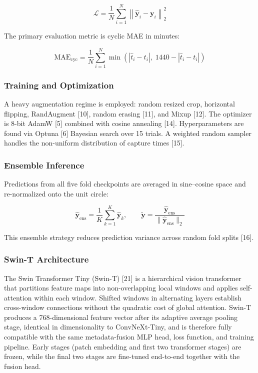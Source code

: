 \documentclass[9pt, a4paper, twocolumn]{article}
\begin{document}
\begin{equation}
\mathcal{L} = \frac{1}{N} \sum_{i=1}^{N}
    \left\| \hat{\mathbf{y}}_i - \mathbf{y}_i \right\|_2^2
\end{equation}

The primary evaluation metric is cyclic MAE in minutes:

\begin{equation}
\text{MAE}_{\text{cyc}} = \frac{1}{N} \sum_{i=1}^{N}
    \min\!\left(|\hat{t}_i - t_i|,\; 1440 - |\hat{t}_i - t_i|\right)
\end{equation}

\subsubsection{Training and Optimization}

A heavy augmentation regime is employed: random resized crop, horizontal flipping, RandAugment [10], random erasing [11], and Mixup [12]. The optimizer is 8-bit AdamW [5] combined with cosine annealing [14]. Hyperparameters are found via Optuna [6] Bayesian search over 15 trials. A weighted random sampler handles the non-uniform distribution of capture times [15].

\subsubsection{Ensemble Inference}

Predictions from all five fold checkpoints are averaged in sine--cosine space and re-normalized onto the unit circle:

\begin{equation}
\hat{\mathbf{y}}_{\text{ens}} = \frac{1}{K} \sum_{k=1}^{K}
    \hat{\mathbf{y}}_k, \qquad
\tilde{\mathbf{y}} = \frac{\hat{\mathbf{y}}_{\text{ens}}}
    {\|\hat{\mathbf{y}}_{\text{ens}}\|_2}
\end{equation}

This ensemble strategy reduces prediction variance across random fold splits [16].

\subsubsection{Swin-T Architecture}

The Swin Transformer Tiny (Swin-T) [21] is a hierarchical vision transformer that partitions feature maps into non-overlapping local windows and applies self-attention within each window. Shifted windows in alternating layers establish cross-window connections without the quadratic cost of global attention. Swin-T produces a 768-dimensional feature vector after its adaptive average pooling stage, identical in dimensionality to ConvNeXt-Tiny, and is therefore fully compatible with the same metadata-fusion MLP head, loss function, and training pipeline. Early stages (patch embedding and first two transformer stages) are frozen, while the final two stages are fine-tuned end-to-end together with the fusion head.
\end{document}
